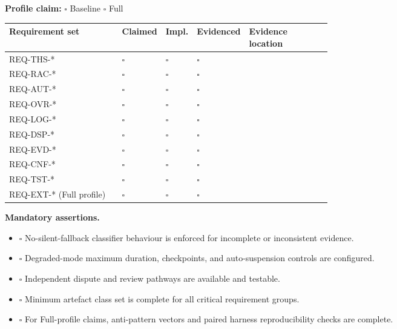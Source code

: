 \documentclass[11pt]{article}
\theoremstyle{definition}
\theoremstyle{plain}
\theoremstyle{remark}
\begin{document}
\vspace{0.5em}
\textbf{Profile claim:} $\square$ Baseline \hspace{1.2em} $\square$ Full

\begin{center}
\setlength{\tabcolsep}{5pt}
\renewcommand{\arraystretch}{1.06}
\begin{tabularx}{0.98\linewidth}{p{0.35\linewidth} p{0.08\linewidth} p{0.09\linewidth} p{0.10\linewidth} Y}
\textbf{Requirement set} & \textbf{Claimed} & \textbf{Impl.} & \textbf{Evidenced} & \textbf{Evidence location} \\ \hline
{}
REQ-THS-* & $\square$ & $\square$ & $\square$ & \\
REQ-RAC-* & $\square$ & $\square$ & $\square$ & \\
REQ-AUT-* & $\square$ & $\square$ & $\square$ & \\
REQ-OVR-* & $\square$ & $\square$ & $\square$ & \\
REQ-LOG-* & $\square$ & $\square$ & $\square$ & \\
REQ-DSP-* & $\square$ & $\square$ & $\square$ & \\
REQ-EVD-* & $\square$ & $\square$ & $\square$ & \\
REQ-CNF-* & $\square$ & $\square$ & $\square$ & \\
REQ-TST-* & $\square$ & $\square$ & $\square$ & \\
REQ-EXT-* (Full profile) & $\square$ & $\square$ & $\square$ & \\
\end{tabularx}
\end{center}

\textbf{Mandatory assertions.}
\begin{itemize}[leftmargin=*]
  \item $\square$ No-silent-fallback classifier behaviour is enforced for incomplete or inconsistent evidence.
  \item $\square$ Degraded-mode maximum duration, checkpoints, and auto-suspension controls are configured.
  \item $\square$ Independent dispute and review pathways are available and testable.
  \item $\square$ Minimum artefact class set is complete for all critical requirement groups.
  \item $\square$ For Full-profile claims, anti-pattern vectors and paired harness reproducibility checks are complete.
\end{itemize}
\end{document}
